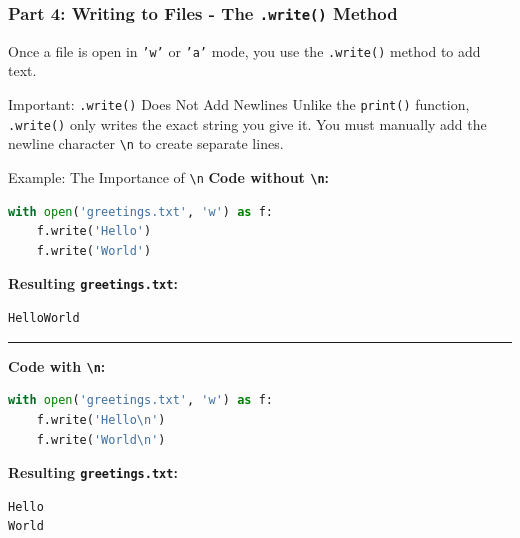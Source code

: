 \documentclass{beamer}
\begin{document}
\begin{frame}[fragile]
    \frametitle{Part 4: Writing to Files - The \texttt{.write()} Method}
    Once a file is open in \texttt{'w'} or \texttt{'a'} mode, you use the \texttt{.write()} method to add text.

    \begin{block}{Important: \texttt{.write()} Does Not Add Newlines}
        Unlike the \texttt{print()} function, \texttt{.write()} only writes the exact string you give it. You must manually add the newline character \texttt{\textbackslash{}n} to create separate lines.
    \end{block}

    \begin{exampleblock}{Example: The Importance of \texttt{\textbackslash{}n}}
        \textbf{Code without \texttt{\textbackslash{}n}:}
\begin{lstlisting}[language=Python]
with open('greetings.txt', 'w') as f:
    f.write('Hello')
    f.write('World')
\end{lstlisting}
        \textbf{Resulting \texttt{greetings.txt}:}
\begin{lstlisting}[language=text, frame=none]
HelloWorld
\end{lstlisting}
        \hrule
        \vspace{0.5em}
        \textbf{Code with \texttt{\textbackslash{}n}:}
\begin{lstlisting}[language=Python]
with open('greetings.txt', 'w') as f:
    f.write('Hello\n')
    f.write('World\n')
\end{lstlisting}
        \textbf{Resulting \texttt{greetings.txt}:}
\begin{lstlisting}[language=text, frame=none]
Hello
World
\end{lstlisting}
    \end{exampleblock}
\end{frame}
\end{document}
